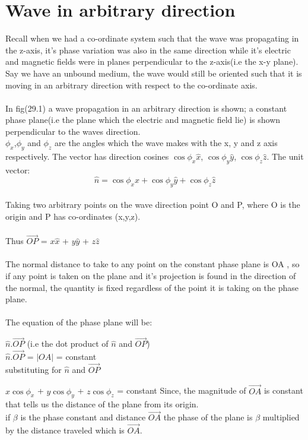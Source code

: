 \section{\textbf{Wave in arbitrary direction}}
Recall when we had a co-ordinate system such that the wave was propagating in the z-axis, it's phase variation was also in the same direction while it's electric and magnetic fields were in planes perpendicular to the z-axis(i.e the x-y plane).
Say we have an unbound medium, the wave would still be oriented such that it is moving in an arbitrary direction with respect to the co-ordinate axis.
\\
\\
In fig(29.1) a wave propagation in an arbitrary direction is shown; a constant phase plane(i.e the plane which the electric and magnetic field lie) is shown perpendicular to the waves direction.\\
$\phi_{x}$,$\phi_{y}$ and $\phi_{z}$ are the angles which the wave makes with the x, y and z axis respectively. 
The vector has direction cosines $\cos\phi_{x}\hat{x}$, $\cos\phi_{y}\hat{y}$, $\cos\phi_{z}\hat{z}$. The unit vector:
\begin{equation}
\hat{n} = \cos\phi_{x}\hat{x} + \cos\phi_{y}\hat{y} + \cos\phi_{z}\hat{z}
\end{equation}
\\
Taking two arbitrary points on the wave direction point O and P, where O is the origin and P has co-ordinates (x,y,z).
\\
\\
Thus $\vec{OP}$ = $x\hat{x}$ + $y\hat{y}$ + $z\hat{z}$
\\
\\
The normal distance to take to any point on the constant phase plane is OA , so if any point is taken on the plane and it's projection is found in the direction of the normal, the quantity is fixed regardless of the point it is taking on the phase plane.
\\
\\
The equation of the phase plane will be:
\\

\begin{center}
$\hat{n}$.$\vec{OP}$ (i.e the dot product of $\hat{n}$ and $\vec{OP}$)
\\
$\hat{n}$.$\vec{OP}$ = $\left|OA \right|$  = constant
\\
substituting for $\hat{n}$ and $\vec{OP}$
\end{center}
$x\cos\phi_{x}$ + $y\cos\phi_{y}$ + $z\cos\phi_{z}$ = constant
Since, the magnitude of $\vec{OA}$ is constant that tells us the distance of the plane from its origin.
\\
if $\beta$ is the phase constant and distance $\vec{OA}$ the phase of the plane is $\beta$ multiplied by the distance traveled which is $\vec{OA}$.


